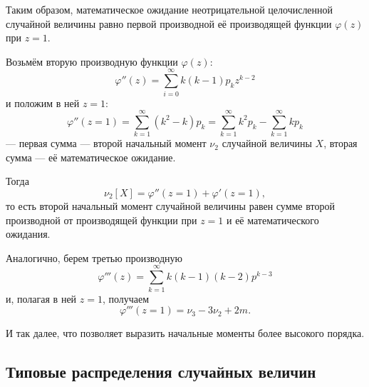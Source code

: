 \documentclass[a4paper]{article}
\begin{document}
                Таким образом, математическое ожидание неотрицательной целочисленной случайной величины равно первой производной её производящей функции $\varphi (z)$ при $z = 1$.

                Возьмём вторую производную функции $\varphi (z)$:
                \begin{equation*}
                    \varphi '' (z) = \sum\limits_{i = 0}^{\infty} k (k - 1) p_k z^{k - 2}
                \end{equation*}
                и положим в ней $z = 1$:
                \begin{equation*}
                    \varphi '' (z = 1) = \sum\limits_{k = 1}^{\infty} (k^2 - k) p_k =
                        \sum\limits_{k = 1}^{\infty} k^2 p_k -
                        \sum\limits_{k = 1}^{\infty} k p_k
                \end{equation*}
                --- первая сумма --- второй начальный момент $\nu_2$ случайной величины $X$, вторая сумма --- её математическое ожидание.

                Тогда
                \begin{equation*}
                    \nu_2 [X] = \varphi '' (z = 1) + \varphi ' (z = 1) ,
                \end{equation*}
                то есть второй начальный момент случайной величины равен сумме второй производной от производящей функции при $z = 1$ и её математического ожидания.

                Аналогично, берем третью производную
                \begin{equation*}
                    \varphi ''' (z) =
                        \sum\limits_{k = 1}^{\infty} k (k - 1) (k - 2) p^{k - 3}
                \end{equation*}
                и, полагая в ней $z = 1$, получаем
                \begin{equation*}
                    \varphi ''' (z = 1) = \nu_3 - 3 \nu_2 + 2 m .
                \end{equation*}
                
                И так далее, что позволяет выразить начальные моменты более высокого порядка.

        \newpage

        \subsection{Типовые распределения случайных величин}
\end{document}
